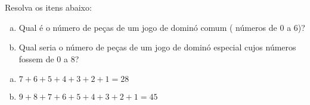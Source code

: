 \begin{ex}
   Resolva os itens abaixo:
   \begin{enumerate}[(a)]
   \item Qual é o número de peças de um jogo de dominó comum ( números de 0 a 6)?
   \item Qual seria o número de peças de um jogo de dominó especial cujos números fossem de 0 a 8?
   \end{enumerate}
     \begin{sol}
       \phantom{A}
         \begin{enumerate} [(a)]
             \item $7+6+5+4+3+2+1=28$
             \item $9+8+7+6+5+4+3+2+1=45$
         \end{enumerate}
     \end{sol}
\end{ex}